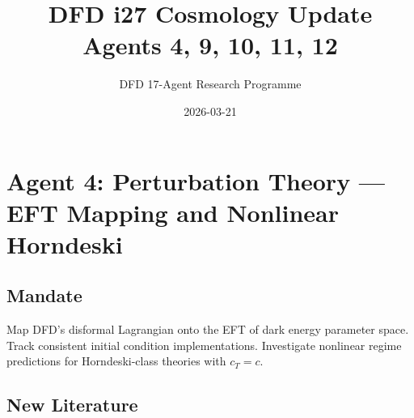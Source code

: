 \documentclass[11pt,a4paper]{article}
\title{DFD i27 Cosmology Update\\Agents 4, 9, 10, 11, 12}
\author{DFD 17-Agent Research Programme}
\date{2026-03-21}
\begin{document}
\maketitle
\tableofcontents
\newpage

\section{Agent 4: Perturbation Theory --- EFT Mapping and Nonlinear Horndeski}

\subsection{Mandate}
Map DFD's disformal Lagrangian onto the EFT of dark energy parameter space. Track consistent initial condition implementations. Investigate nonlinear regime predictions for Horndeski-class theories with $c_T = c$.

\subsection{New Literature}
\end{document}
